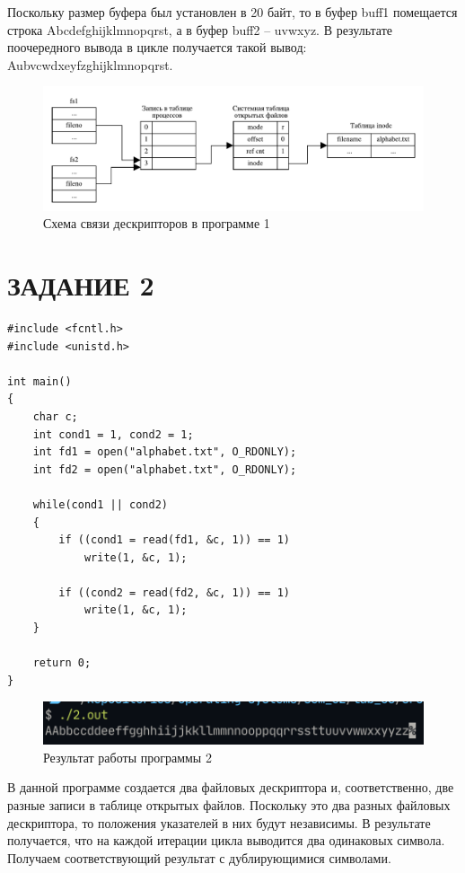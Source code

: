 Поскольку размер буфера был установлен в 20 байт, то в буфер {\ttfamily buff1}
помещается строка {\ttfamily Abcdefghijklmnopqrst}, а в буфер {\ttfamily buff2}
-- {\ttfamily uvwxyz}. В результате поочередного вывода в цикле получается
такой вывод: {\ttfamily Aubvcwdxeyfzghijklmnopqrst}.

\begin{figure}[H]
    \centering
    \includegraphics[scale=0.8]{img/1.pdf}
    \caption{Схема связи дескрипторов в программе 1}
\end{figure}

\section{ЗАДАНИЕ 2}

\begin{lstlisting}[caption=Текст программы задания 2]
#include <fcntl.h>
#include <unistd.h>

int main()
{
    char c;
    int cond1 = 1, cond2 = 1;
    int fd1 = open("alphabet.txt", O_RDONLY);
    int fd2 = open("alphabet.txt", O_RDONLY);

    while(cond1 || cond2)
    {
        if ((cond1 = read(fd1, &c, 1)) == 1)
            write(1, &c, 1);

        if ((cond2 = read(fd2, &c, 1)) == 1)
            write(1, &c, 1);
    }

    return 0;
}
\end{lstlisting}

\begin{figure}[H]
    \centering
    \includegraphics[scale=1.0]{img/2.png}
    \caption{Результат работы программы 2}
\end{figure}

В данной программе создается два файловых дескриптора и, соответственно, две
разные записи в таблице открытых файлов. Поскольку это два разных файловых
дескриптора, то положения указателей в них будут независимы. В результате
получается, что на каждой итерации цикла выводится два одинаковых символа.
Получаем соответствующий результат с дублирующимися символами.

